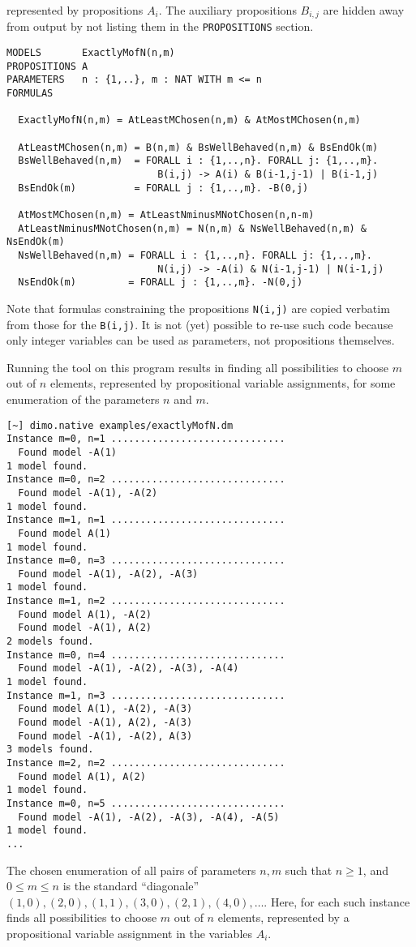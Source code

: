 \documentclass[twoside]{article}
\begin{document}
represented by propositions $A_i$. The auxiliary propositions $B_{i,j}$ are hidden away from output by not listing them in the \texttt{PROPOSITIONS}
section.
\begin{verbatim}
MODELS       ExactlyMofN(n,m)
PROPOSITIONS A
PARAMETERS   n : {1,..}, m : NAT WITH m <= n
FORMULAS

  ExactlyMofN(n,m) = AtLeastMChosen(n,m) & AtMostMChosen(n,m)

  AtLeastMChosen(n,m) = B(n,m) & BsWellBehaved(n,m) & BsEndOk(m)
  BsWellBehaved(n,m)  = FORALL i : {1,..,n}. FORALL j: {1,..,m}. 
                          B(i,j) -> A(i) & B(i-1,j-1) | B(i-1,j) 
  BsEndOk(m)          = FORALL j : {1,..,m}. -B(0,j)

  AtMostMChosen(n,m) = AtLeastNminusMNotChosen(n,n-m)
  AtLeastNminusMNotChosen(n,m) = N(n,m) & NsWellBehaved(n,m) & NsEndOk(m)
  NsWellBehaved(n,m) = FORALL i : {1,..,n}. FORALL j: {1,..,m}. 
                          N(i,j) -> -A(i) & N(i-1,j-1) | N(i-1,j)
  NsEndOk(m)         = FORALL j : {1,..,m}. -N(0,j)
\end{verbatim}
Note that formulas constraining the propositions \texttt{N(i,j)} are copied verbatim from those for the \texttt{B(i,j)}. It is not (yet) possible to
re-use such code because only integer variables can be used as parameters, not propositions themselves. 

Running the \DiMo tool on this program results in finding all possibilities to choose $m$ out of $n$ elements, represented by propositional variable
assignments, for some enumeration of the parameters $n$ and $m$.
\begin{verbatim}
[~] dimo.native examples/exactlyMofN.dm
Instance m=0, n=1 .............................. 
  Found model -A(1)
1 model found.
Instance m=0, n=2 .............................. 
  Found model -A(1), -A(2)
1 model found.
Instance m=1, n=1 .............................. 
  Found model A(1)
1 model found.
Instance m=0, n=3 .............................. 
  Found model -A(1), -A(2), -A(3)
1 model found.
Instance m=1, n=2 .............................. 
  Found model A(1), -A(2)
  Found model -A(1), A(2)
2 models found.
Instance m=0, n=4 .............................. 
  Found model -A(1), -A(2), -A(3), -A(4)
1 model found.
Instance m=1, n=3 .............................. 
  Found model A(1), -A(2), -A(3)
  Found model -A(1), A(2), -A(3)
  Found model -A(1), -A(2), A(3)
3 models found.
Instance m=2, n=2 .............................. 
  Found model A(1), A(2)
1 model found.
Instance m=0, n=5 .............................. 
  Found model -A(1), -A(2), -A(3), -A(4), -A(5)
1 model found.
...
\end{verbatim}
The chosen enumeration of all pairs of parameters $n,m$ such that $n \ge 1$, and $0 \le m \le n$ is the standard ``diagonale'' $(1,0),(2,0),(1,1),(3,0),(2,1),(4,0),\ldots$.
Here, for each such instance \DiMo finds all possibilities to choose $m$ out of $n$ elements, represented by a propositional variable assignment in the variables $A_i$. 
\end{document}
